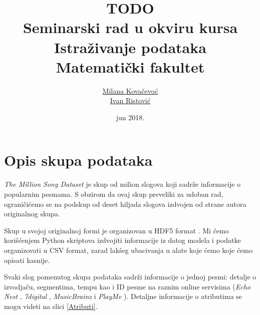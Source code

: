 \documentclass[a4paper]{article}
\begin{document}
\title{TODO\\ \small{Seminarski rad u okviru kursa\\Istra\v{z}ivanje podataka\\ Matematički fakultet}}

\author{\href{mailto:mi14031@matf.bg.ac.rs}{Milana Kova\v{c}evo\'c}\\\href{mailto:mi14042@matf.bg.ac.rs}{Ivan Ristovi\'c}}
\date{jun 2018.}


\maketitle

\tableofcontents

\newpage


\section{Opis skupa podataka}
\label{sec:Opis skupa podataka}

\emph{The Million Song Dataset} \cite{Dataset} je skup od milion slogova koji sadr\v{z}e informacije o popularnim pesmama. S obzirom da ovaj skup preveliki za udoban rad, ograni\v{c}i\'c{}emo se na podskup od deset hiljada slogova izdvojen od strane autora originalnog skupa.

Skup u svojoj originalnoj formi je organizovan u HDF5 format \cite{HDF5}. Mi \'c{}emo kori\v{s}\'c{}enjem Python skriptova izdvojiti informacije iz datog modela i podatke organizovati u CSV format, zarad lak\v{s}eg ubacivanja u alate koje \'c{}emo koje \'c{}emo opisati kasnije.

Svaki slog pomenutog skupa podataka sadr\v{z}i informacije o jednoj pesmi: detalje o izvodja\v{c}u, segmentima, tempu kao i ID pesme na raznim online servisima (\emph{Echo Nest} \cite{EchoNest}, \emph{7digital} \cite{7digital},  \emph{MusicBrainz} \cite{MusicBrainz} i \emph{PlayMe} \cite{PlayMe}). Detaljne informacije o atributima se mogu videti na slici \ref{Atributi}.
\end{document}
